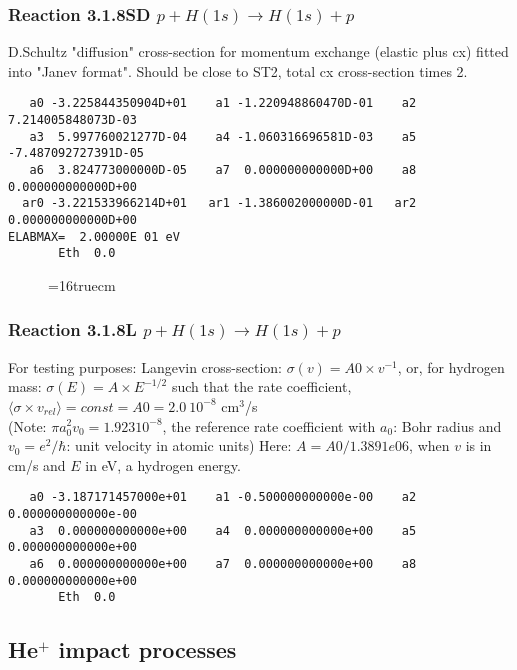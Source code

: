 \documentclass[12pt,dvipdfmx]{article}
\begin{document}
\subsubsection{
Reaction 3.1.8SD $  p + H(1s) \rightarrow H(1s) + p  $
}
D.Schultz "diffusion" cross-section for momentum exchange (elastic plus cx)
fitted into "Janev format". Should be close to ST2, total cx cross-section times 2.

\begin{small}\begin{verbatim}
   a0 -3.225844350904D+01    a1 -1.220948860470D-01    a2  7.214005848073D-03
   a3  5.997760021277D-04    a4 -1.060316696581D-03    a5 -7.487092727391D-05
   a6  3.824773000000D-05    a7  0.000000000000D+00    a8  0.000000000000D+00
  ar0 -3.221533966214D+01   ar1 -1.386002000000D-01   ar2  0.000000000000D+00
ELABMAX=  2.00000E 01 eV
       Eth  0.0
\end{verbatim}\end{small}


\begin{figure} \label{318RS}
\epsfxsize=16truecm
\end{figure}
\newpage
\subsubsection{
Reaction 3.1.8L $  p + H(1s) \rightarrow H(1s) + p  $
}
For testing purposes:
Langevin cross-section: $\sigma(v)=A0 \times v^{-1}$, or, for hydrogen mass: $\sigma(E)=A \times E^{-1/2}$
such that the rate coefficient,
$\langle\sigma \times v_{rel} \rangle= const = A0 = 2.0~ 10^{-8}$ cm$^3$/s\\
(Note: $\pi a_0^2 v_0 = 1.923 10^{-8}$, the reference rate coefficient with $a_0$: Bohr radius
and $v_0 =e^2/\hbar$: unit velocity in atomic units)
Here: $A = A0/1.3891e 06$, when $v$ is in cm/s and $E$ in eV, a hydrogen energy.

\begin{small}\begin{verbatim}
   a0 -3.187171457000e+01    a1 -0.500000000000e-00    a2  0.000000000000e-00
   a3  0.000000000000e+00    a4  0.000000000000e+00    a5  0.000000000000e+00
   a6  0.000000000000e+00    a7  0.000000000000e+00    a8  0.000000000000e+00
       Eth  0.0
\end{verbatim}\end{small}

\newpage
\subsection{He$^+$ impact processes}
\end{document}
